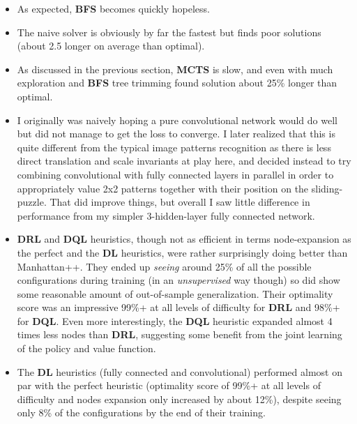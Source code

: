 \begin{itemize}
\item As expected, \textbf{BFS} becomes quickly hopeless.
\item The naive solver is obviously by far the fastest but finds poor solutions (about 2.5 longer on average than optimal).
\item As discussed in the previous section, \textbf{MCTS} is slow, and even with much exploration and \textbf{BFS} tree trimming found solution about 25\% longer than optimal.
\item I originally was naively hoping a pure convolutional network would do well but did not manage to get the loss to converge. I later realized that this is quite different from the typical image patterns recognition as there is less direct translation and scale invariants at play here, and decided instead to try combining convolutional with fully connected layers in parallel in order to appropriately value 2x2 patterns together with their position on the sliding-puzzle. That did improve things, but overall I saw little difference in performance from my simpler 3-hidden-layer fully connected network.
\item \textbf{DRL} and \textbf{DQL} heuristics, though not as efficient in terms node-expansion as the perfect and the \textbf{DL} heuristics, were rather surprisingly doing better than Manhattan++. They ended up \textit{seeing} around 25\% of all the possible configurations during training (in an \textit{unsupervised} way though) so did show some reasonable amount of out-of-sample generalization. Their optimality score was an impressive 99\%+ at all levels of difficulty for \textbf{DRL} and 98\%+ for \textbf{DQL}. Even more interestingly, the \textbf{DQL} heuristic expanded almost 4 times less nodes than \textbf{DRL}, suggesting some benefit from the joint learning of the policy and value function.
\item The \textbf{DL} heuristics (fully connected and convolutional) performed almost on par with the perfect heuristic (optimality score of 99\%+ at all levels of difficulty and nodes expansion only increased by about 12\%), despite seeing only 8\% of the configurations by the end of their training.
\end{itemize}


